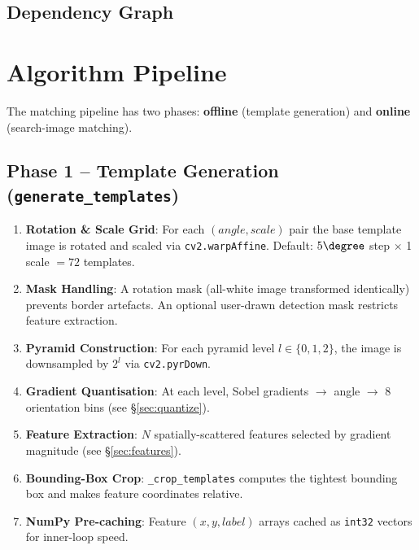 \documentclass[11pt,a4paper]{article}
\begin{document}
\subsection{Dependency Graph}
\begin{center}
\end{center}

\section{Algorithm Pipeline}

The matching pipeline has two phases: \textbf{offline} (template generation) and \textbf{online} (search-image matching).

\subsection{Phase 1 -- Template Generation (\texttt{generate\_templates})}
\begin{enumerate}
\item \textbf{Rotation \& Scale Grid}: For each $(angle, scale)$ pair the base template image is rotated and scaled via \texttt{cv2.warpAffine}. Default: $5\degree$ step $\times$ 1 scale $= 72$ templates.
\item \textbf{Mask Handling}: A rotation mask (all-white image transformed identically) prevents border artefacts. An optional user-drawn detection mask restricts feature extraction.
\item \textbf{Pyramid Construction}: For each pyramid level $l \in \{0,1,2\}$, the image is downsampled by $2^l$ via \texttt{cv2.pyrDown}.
\item \textbf{Gradient Quantisation}: At each level, Sobel gradients $\rightarrow$ angle $\rightarrow$ 8 orientation bins (see \S\ref{sec:quantize}).
\item \textbf{Feature Extraction}: $N$ spatially-scattered features selected by gradient magnitude (see \S\ref{sec:features}).
\item \textbf{Bounding-Box Crop}: \texttt{\_crop\_templates} computes the tightest bounding box and makes feature coordinates relative.
\item \textbf{NumPy Pre-caching}: Feature $(x,y,label)$ arrays cached as \texttt{int32} vectors for inner-loop speed.
\end{enumerate}
\end{document}

